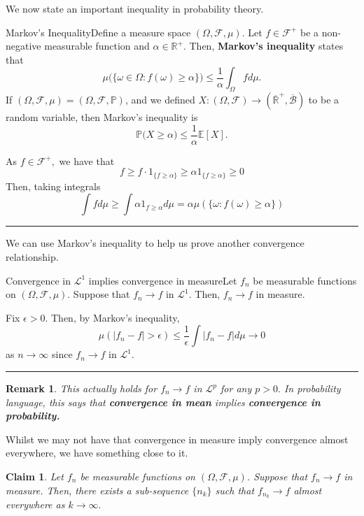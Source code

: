 \documentclass[twoside]{article}
\newtheorem{claim}[theorem]{Claim}
\newtheorem{remark}[theorem]{Remark}
\newenvironment{proof}{{\bf Proof:}}{\hfill\rule{2mm}{2mm}}
\newcommand{\sigmalgebra}{\mathcal{F}}
\newcommand{\borelsigmaalgebra}{\mathcal{B}}
\newcommand{\positiveextendedreal}{\overline{\mathbb{R}}^+}
\newcommand{\prob}{\mathbb{P}}
\begin{document}
We now state an important inequality in probability theory.

\begin{proposition_exam}{Markov's Inequality}{}Define a measure space $(\Omega, \sigmalgebra, \mu)$. Let $f \in \mathcal{F}^+$ be a non-negative measurable function and $\alpha \in \mathbb{R}^+$. Then, \textbf{Markov's inequality} states that 
$$
\mu\bigg(\{\omega \in \Omega: f(\omega) \geq \alpha\} \bigg) \leq \frac{1}{\alpha}\int_{\Omega}fd\mu.
$$
If $(\Omega, \sigmalgebra, \mu) = (\Omega, \sigmalgebra, \prob)$, and we defined $X:(\Omega, \sigmalgebra) \rightarrow (\positiveextendedreal, \overline{\borelsigmaalgebra})$ to be a random variable, then Markov's inequality is 
$$
\prob\bigg(X \geq \alpha \bigg) \leq \frac{1}{\alpha}\mathbb{E}[X].
$$
\end{proposition_exam}

\begin{proof} As $f \in \sigmalgebra^+,$ we have that 
$$
f \geq f \cdot 1_{\{f \geq \alpha\}} \geq \alpha 1_{\{f \geq \alpha\}} \geq 0
$$
Then, taking integrals 
$$
\int fd\mu \geq \int \alpha 1_{f \geq \alpha}d\mu = \alpha \mu(\{\omega: f(\omega) \geq \alpha\})
$$
\end{proof}

We can use Markov's inequality to help us prove another convergence relationship.
\begin{proposition_exam}{Convergence in $\mathcal{L}^1$ implies convergence in measure}{}Let $f_n$ be measurable functions on $(\Omega, \mathcal{F}, \mu)$. Suppose that $f_n \rightarrow f$ in $\mathcal{L}^1.$ Then, $f_n \rightarrow f$ in measure.
\end{proposition_exam}

\begin{proof} Fix $\epsilon > 0.$ Then, by Markov's inequality, 
$$
\mu(|f_n - f| > \epsilon) \leq \frac{1}{\epsilon}\int |f_n - f|d\mu \rightarrow 0
$$
as $n \rightarrow \infty$ since $f_n \rightarrow f$ in $\mathcal{L}^1.$
\end{proof}

\begin{remark} This actually holds for $f_n \rightarrow f$ in $\mathcal{L}^p$ for any $p > 0.$ In probability language, this says that \textbf{convergence in mean} implies \textbf{convergence in probability.}
\end{remark}

Whilst we may not have that convergence in measure imply convergence almost everywhere, we have something close to it.
\begin{claim}Let $f_n$ be measurable functions on $(\Omega, \mathcal{F}, \mu)$. Suppose that $f_n \rightarrow f$ in measure. Then, there exists a sub-sequence $\{n_k\}$ such that $f_{n_{k}} \rightarrow f$ almost everywhere as $k \rightarrow \infty.$ 
\end{claim}
\end{document}
